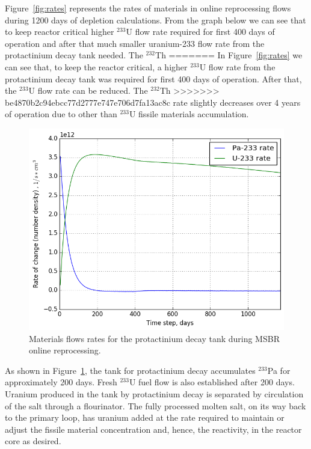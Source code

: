 \documentclass{anstrans}
\begin{document}
Figure~\ref{fig:rates} represents the rates of materials in online reprocessing 
flows during 1200 days of depletion calculations. From the graph below we can 
see that to keep reactor critical higher $^{233}$U 
flow rate required for first 400 days of operation and after that much smaller 
uranium-233 flow rate from the protactinium decay tank needed. The $^{232}$Th 
=======
In Figure~\ref{fig:rates} we can see that, to keep the reactor critical, a higher $^{233}$U 
flow rate from the protactinium decay tank was required for first 400 days of 
operation. After that, the $^{233}$U flow rate can be reduced. The $^{232}$Th 
>>>>>>> be4870b2c94ebcc77d2777e747e706d7fa13ac8c
rate slightly decreases over 4 years of operation due to other than $^{233}$U 
fissile materials accumulation.

\begin{figure}[htbp!] %
        \centering
        \includegraphics[width=1.03\linewidth]{rates_outflow.png}
        \caption{Materials flows rates for the protactinium decay tank during 
        \gls{MSBR} online reprocessing.}
        \label{fig:outflow}
\end{figure}
As shown in Figure~\ref{fig:outflow}, the tank for protactinium decay 
accumulates $^{233}$Pa for approximately 200 days. Fresh $^{233}$U fuel flow is 
also established after 200 days. Uranium produced in the tank by protactinium 
decay is separated by circulation of the salt through a flourinator. The fully 
processed molten salt, on its way back to the primary loop, has uranium added 
at the rate required to maintain or adjust the fissile material concentration 
and, hence, the reactivity, in the reactor core as desired.
\end{document}
